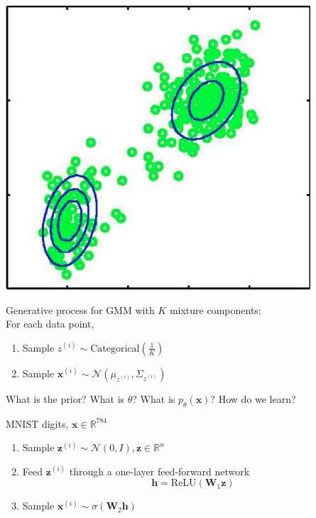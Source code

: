 \documentclass{beamer}
\newcommand{\zvec}{\mathbf{z}}
\newcommand{\xvec}{\mathbf{x}}
\newcommand{\reals}{\ensuremath{\mathbb{R}}}
\begin{document}
\begin{frame}
  \begin{center}
   \end{center}
   \center
\includegraphics[scale=0.5]{gmm2}
\end{frame}

\begin{frame}
  \begin{center}
   \end{center}   
 Generative process for GMM with $K$ mixture components: \\
 For each data point, 
 \begin{enumerate}
 \item Sample $z^{(i)} \sim \text{Categorical}(\frac{1}{K})$ 
 \item Sample $\xvec^{(i)} \sim \mathcal{N}(\mu_{z^{(i)}}, \Sigma_{z^{(i)}})$
 \end{enumerate}
 
 What is the prior? What is $\theta$? What is $p_\theta(\xvec)$? How do we learn?
\end{frame}

\begin{frame}
  \begin{center}
   \end{center}   
MNIST digits, $\xvec \in \reals^{784}$
 \begin{enumerate}
 \item Sample $\zvec^{(i)} \sim \mathcal{N}(0, I), \zvec \in \reals^n$ 
 \item Feed $\zvec^{(i)}$ through a one-layer feed-forward network
 \[ \mathbf{h} = \text{ReLU}(\mathbf{W}_1 \zvec)\]
 \item Sample $\xvec^{(i)} \sim \sigma(\mathbf{W}_2 \mathbf{h})$
 \end{enumerate}
\end{frame}
\end{document}
